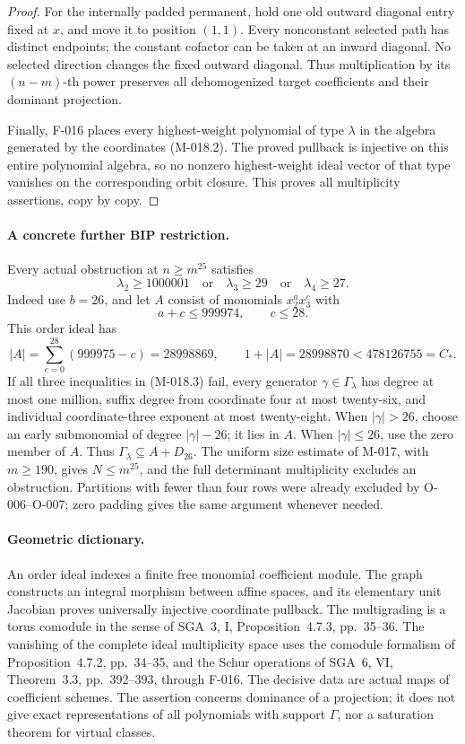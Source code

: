 \begin{proof}
For the internally padded permanent, hold one old outward
diagonal entry fixed at \(x\), and move it to position \((1,1)\).
Every nonconstant selected path has distinct endpoints; the
constant cofactor can be taken at an inward diagonal. No selected
direction changes the fixed outward diagonal. Thus multiplication
by its \((n-m)\)-th power preserves all dehomogenized target
coefficients and their dominant projection.

Finally, F-016 places every highest-weight polynomial of type
\(\lambda\) in the algebra generated by the coordinates
(M-018.2). The proved pullback is injective on this entire
polynomial algebra, so no nonzero highest-weight ideal vector
of that type vanishes on the corresponding orbit closure.
This proves all multiplicity assertions, copy by copy.
\end{proof}

\paragraph{A concrete further BIP restriction.}
Every actual obstruction at \(n\geq m^{25}\) satisfies
\[
 \lambda_2\geq1000001\quad\text{or}\quad
 \lambda_3\geq29\quad\text{or}\quad\lambda_4\geq27.
                                                               \tag{M-018.3}
\]
Indeed use \(b=26\), and let \(A\) consist of monomials
\(x_2^a x_3^c\) with
\[
                  a+c\leq999974,\qquad c\leq28.
\]
This order ideal has
\[
 |A|=\sum_{c=0}^{28}(999975-c)=28998869,
                \qquad 1+|A|=28998870<478126755=C_*.
\]
If all three inequalities in (M-018.3) fail, every generator
\(\gamma\in\Gamma_\lambda\) has degree at most one million,
suffix degree from coordinate four at most twenty-six, and
individual coordinate-three exponent at most twenty-eight.
When \(|\gamma|>26\), choose an early submonomial of degree
\(|\gamma|-26\); it lies in \(A\). When \(|\gamma|\leq26\),
use the zero member of \(A\). Thus
\(\Gamma_\lambda\subseteq A+D_{26}\).
The uniform size estimate of M-017, with \(m\geq190\),
gives \(N\leq m^{25}\), and the full determinant multiplicity
excludes an obstruction. Partitions with fewer than four rows
were already excluded by O-006--O-007; zero padding gives the
same argument whenever needed.

\paragraph{Geometric dictionary.}
An order ideal indexes a finite free monomial coefficient module.
The graph constructs an integral morphism between affine spaces,
and its elementary unit Jacobian proves universally injective
coordinate pullback. The multigrading is a torus comodule in the
sense of SGA~3, I, Proposition~4.7.3, pp.~35--36. The vanishing
of the complete ideal multiplicity space uses the comodule
formalism of Proposition~4.7.2, pp.~34--35, and the Schur
operations of SGA~6, VI, Theorem~3.3, pp.~392--393, through
F-016. The decisive data are actual maps of coefficient schemes.
The assertion concerns dominance of a projection; it does not
give exact representations of all polynomials with support
\(\Gamma\), nor a saturation theorem for virtual classes.
